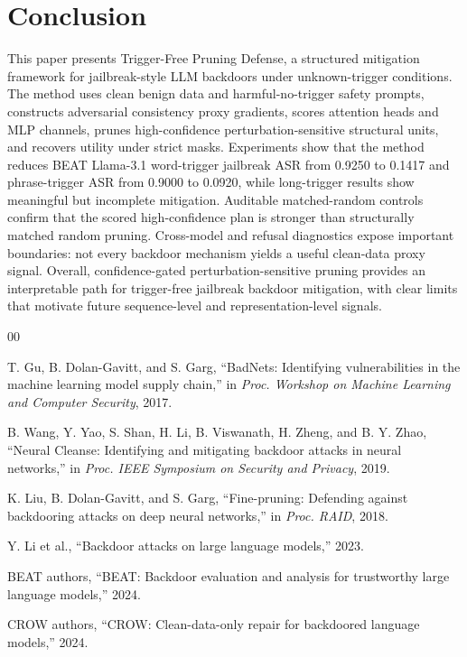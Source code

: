 \documentclass[lettersize,journal]{IEEEtran}
\begin{document}
\section{Conclusion}
This paper presents Trigger-Free Pruning Defense, a structured mitigation framework for jailbreak-style LLM backdoors under unknown-trigger conditions. The method uses clean benign data and harmful-no-trigger safety prompts, constructs adversarial consistency proxy gradients, scores attention heads and MLP channels, prunes high-confidence perturbation-sensitive structural units, and recovers utility under strict masks. Experiments show that the method reduces BEAT Llama-3.1 word-trigger jailbreak ASR from 0.9250 to 0.1417 and phrase-trigger ASR from 0.9000 to 0.0920, while long-trigger results show meaningful but incomplete mitigation. Auditable matched-random controls confirm that the scored high-confidence plan is stronger than structurally matched random pruning. Cross-model and refusal diagnostics expose important boundaries: not every backdoor mechanism yields a useful clean-data proxy signal. Overall, confidence-gated perturbation-sensitive pruning provides an interpretable path for trigger-free jailbreak backdoor mitigation, with clear limits that motivate future sequence-level and representation-level signals.

\begin{thebibliography}{00}

T. Gu, B. Dolan-Gavitt, and S. Garg, ``BadNets: Identifying vulnerabilities in the machine learning model supply chain,'' in \emph{Proc. Workshop on Machine Learning and Computer Security}, 2017.

B. Wang, Y. Yao, S. Shan, H. Li, B. Viswanath, H. Zheng, and B. Y. Zhao, ``Neural Cleanse: Identifying and mitigating backdoor attacks in neural networks,'' in \emph{Proc. IEEE Symposium on Security and Privacy}, 2019.

K. Liu, B. Dolan-Gavitt, and S. Garg, ``Fine-pruning: Defending against backdooring attacks on deep neural networks,'' in \emph{Proc. RAID}, 2018.

Y. Li et al., ``Backdoor attacks on large language models,'' 2023.

BEAT authors, ``BEAT: Backdoor evaluation and analysis for trustworthy large language models,'' 2024.

CROW authors, ``CROW: Clean-data-only repair for backdoored language models,'' 2024.

\end{thebibliography}
\end{document}
